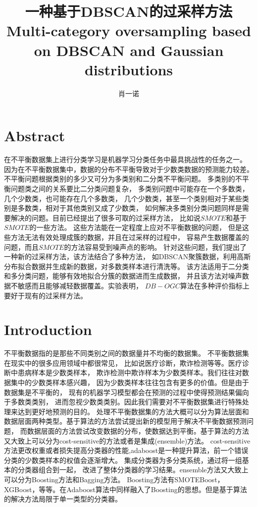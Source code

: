 \documentclass{article}
\begin{document}
\title{一种基于DBSCAN的过采样方法
Multi-category oversampling based on DBSCAN and Gaussian distributions}
\author{肖一诺}
 
\maketitle
\section{Abstract}
在不平衡数据集上进行分类学习是机器学习分类任务中最具挑战性的任务之一。
因为在不平衡数据集中，数据的分布不平衡导致对于少数类数据的预测能力较差。
不平衡问题根据类别的多少又可分为多类别和二分类不平衡问题。
多类别的不平衡问题类之间的关系要比二分类问题复杂，
多类别问题中可能存在一个多数类，几个少数类，也可能存在几个多数类，
几个少数类，甚至一个类别相对于某些类别是多数类，相对于其他类别又成了少数类，
如何解决多类别分类问题同样是需要解决的问题。目前已经提出了很多可取的过采样方法，
比如说$SMOTE$和基于$SMOTE$的一些方法。
这些方法能在一定程度上应对不平衡数据的问题，
但是这些方法无法有效处理成簇的数据，并且在过采样的过程中，
容易产生数据覆盖的问题，而且$SMOTE$的方法容易受到噪声点的影响。
针对这些问题，我们提出了一种新的过采样方法，该方法结合了多种方法，
如DBSCAN聚簇数据，利用高斯分布拟合数据并生成新的数据，对多数类样本进行清洗等。
该方法适用于二分类和多分类问题，能够有效地拟合分簇的数据进而生成数据，
并且该方法对噪声数据不敏感而且能够减轻数据覆盖。实验表明，
$DB-OGC$算法在多种评价指标上要好于现有的过采样方法。

\section{Introduction}
不平衡数据指的是那些不同类别之间的数据量并不均衡的数据集。
不平衡数据集在现实中的很多应用领域中都很常见，
比如说医疗诊断，欺诈检测等等。医疗诊断中患病样本是少数类样本，
欺诈检测中欺诈样本为少数类样本。我们往往对数据集中的少数类样本感兴趣，
因为少数类样本往往包含有更多的价值。但是由于数据集是不平衡的，
现有的机器学习模型都会在预测的过程中使得预测结果偏向于多数类类别，
进而忽视少数类类别。\cite{2016A}因此我们需要对不平衡数据集进行特殊处理来达到更好地预测的目的。
处理不平衡数据集的方法大概可以分为算法层面和数据层面两种类型。基于算法的方法尝试提出新的模型用于解决不平衡数据预测问题，
而数据层面的方法尝试改变数据的分布，使数据达到平衡。基于算法的方法又大致上可以分为cost-sensitive的方法\cite{article,2010Risk}或者是集成(ensemble)方法。
cost-sensitive方法更改权重或者损失提高分类器的性能\cite{2007Highcost-sensitive},adaboost\cite{10.1007/3-540-59119-2_166}是一种提升算法，前一个错误分类的少数类样本的权值会逐渐增大。
集成分类器为多分类系统，通过将一组基本的分类器组合到一起，
改进了整体分类器的学习结果。ensemble方法又大致上可以分为Boosting\cite{article_boosting}方法和Bagging\cite{2018Multi}方法。
Boosting方法有SMOTEBoost\cite{2003SMOTEBoost}，XGBoost\cite{Chen_2016}，等等。在Adaboost\cite{10.1007/3-540-59119-2_166}算法中同样融入了Boosting的思想。但是基于算法的解决方法局限于单一类型的分类器。
\end{document}
